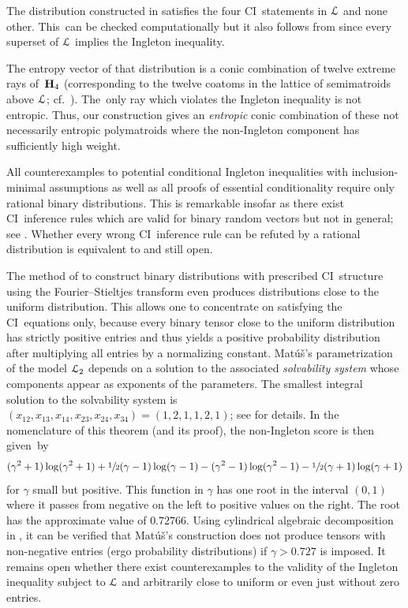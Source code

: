 \documentclass[11pt, a4paper]{tboege-preprint}
\begin{document}
\begin{paraenum}

\item
The distribution constructed in  satisfies the four
CI~statements in $\mathcal{L}$ and none other. This~can be checked computationally
but it also follows from  since every superset of $\mathcal{L}$
implies the Ingleton inequality.

\item
The entropy vector of that distribution is a conic combination of twelve
extreme rays of~$\mathbf{H}_4$ (corresponding to the twelve coatoms in the
lattice of semimatroids above $\mathcal{L}$; cf.~\cite{MatusI}). The~only ray
which violates the Ingleton inequality is not entropic. Thus, our
construction gives an \emph{entropic} conic combination of these not
necessarily entropic polymatroids where the non-Ingleton component has
sufficiently high weight.

\item
All counterexamples to potential conditional Ingleton inequalities with
inclusion-minimal assumptions \cite[Section~IV.B]{StudenyIngleton} as well
as all proofs of essential conditionality \cite[Section~IV.A]{CondInfo}
require only rational binary distributions. This is remarkable insofar
as there exist CI~inference rules which are valid for binary random vectors
but not in general; see \cite{MatusForks}. Whether every wrong CI~inference
rule can be refuted by a rational distribution is equivalent to
\cite[Conjecture]{MatusIII} and still open.

\item
The method of \cite{MatusForks} to construct binary distributions with
prescribed CI~structure using the Fourier--Stieltjes transform even produces
distributions close to the uniform distribution. This allows one to concentrate
on satisfying the CI~equations only, because every binary tensor close to the
uniform distribution has strictly positive entries and thus yields a positive
probability distribution after multiplying all entries by a normalizing
constant.
%
Matúš's parametrization of the model $\mathcal{L}_2$ depends on a solution to the
associated \emph{solvability system} whose components appear as exponents of
the parameters. The smallest integral solution to the solvability system is
$(x_{12}, x_{13}, x_{14}, x_{23}, x_{24}, x_{34}) = (1,2,1,1,2,1)$; see
\cite[Theorem~1]{MatusForks} for details. In the nomenclature of this theorem
(and its proof), the non-Ingleton score is then given~by
\[
  (\gamma^2+1) \log(\gamma^2+1) + \sfrac12 (\gamma-1) \log(\gamma-1)
  - (\gamma^2-1) \log(\gamma^2-1) - \sfrac12 (\gamma+1) \log(\gamma+1)
\]
for $\gamma$ small but positive.
This function in $\gamma$ has one root in the interval $(0,1)$ where
it passes from negative on the left to positive values on the right.
The root has the approximate value of $0.72766$.
Using cylindrical algebraic decomposition in ,
it can be verified that Matúš's construction
does not produce tensors with non-negative entries (ergo probability
distributions) if $\gamma > 0.727$ is imposed.
%
It remains open whether there exist counterexamples to the validity
of the Ingleton inequality subject to $\mathcal{L}$ and arbitrarily close
to uniform or even just without zero entries.


\end{paraenum}
\end{document}
